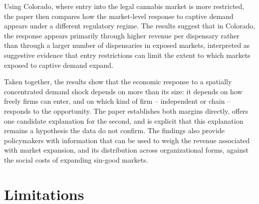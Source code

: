\documentclass[english,12pt]{article}
\begin{document}
Using Colorado, where entry into the legal cannabis market is more restricted, the paper then compares how the market-level response to captive demand appears under a different regulatory regime. The results suggest that in Colorado, the response appears primarily through higher revenue per dispensary rather than through a larger number of dispensaries in exposed markets, interpreted as suggestive evidence that entry restrictions can limit the extent to which markets exposed to captive demand expand.

Taken together, the results show that the economic response to a spatially concentrated demand shock depends on more than its size: it depends on how freely firms can enter, and on which kind of firm -- independent or chain -- responds to the opportunity. The paper establishes both margins directly, offers one candidate explanation for the second, and is explicit that this explanation remains a hypothesis the data do not confirm. The findings also provide policymakers with information that can be used to weigh the revenue associated with market expansion, and its distribution across organizational forms, against the social costs of expanding sin-good markets.

\section{Limitations}
\label{sec:limitations}
\end{document}
